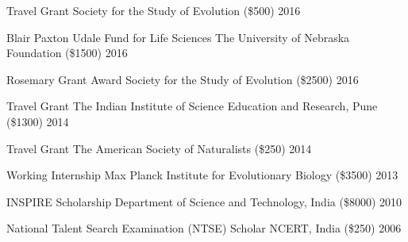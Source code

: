 \begin{cvhonors}
  \cvhonor
    {Travel Grant}
    {Society for the Study of Evolution (\$500)}
    {2016}

  \cvhonor
    {Blair Paxton Udale Fund for Life Sciences}
    {The University of Nebraska Foundation (\$1500)}
    {2016}

  \cvhonor
    {Rosemary Grant Award}
    {Society for the Study of Evolution (\$2500)}
    {2016}

  \cvhonor
    {Travel Grant}
    {The Indian Institute of Science Education and Research, Pune (\$1300)}
    {2014}

  \cvhonor
    {Travel Grant}
    {The American Society of Naturalists (\$250)}
    {2014}

  \cvhonor
    {Working Internship}
    {Max Planck Institute for Evolutionary Biology (\$3500)}
    {2013}

  \cvhonor
    {INSPIRE Scholarship}
    {Department of Science and Technology, India (\$8000)}
    {2010}

  \cvhonor
    {National Talent Search Examination (NTSE) Scholar}
    {NCERT, India (\$250)}
    {2006}

\end{cvhonors}
